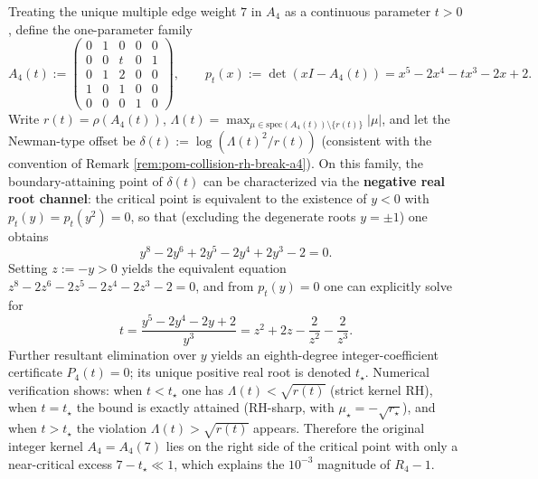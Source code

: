 \begin{remark}\label{rem:pom-collision-rh-break-a4-threshold}
Treating the unique multiple edge weight \(7\) in \(A_4\) as a continuous parameter \(t>0\), define the one-parameter family
\[
A_4(t):=
\begin{pmatrix}
0&1&0&0&0\\
0&0&t&0&1\\
0&1&2&0&0\\
1&0&1&0&0\\
0&0&0&1&0
\end{pmatrix},
\qquad
p_t(x):=\det(xI-A_4(t))=x^5-2x^4-tx^3-2x+2.
\]
Write \(r(t)=\rho(A_4(t))\), \(\Lambda(t)=\max_{\mu\in\mathrm{spec}(A_4(t))\setminus\{r(t)\}}|\mu|\), and let the Newman-type offset be
\(
\delta(t):=\log(\Lambda(t)^2/r(t))
\)
(consistent with the convention of Remark \ref{rem:pom-collision-rh-break-a4}).
On this family, the boundary-attaining point of \(\delta(t)\) can be characterized via the \textbf{negative real root channel}: the critical point is equivalent to the existence of \(y<0\) with \(p_t(y)=p_t(y^2)=0\), so that (excluding the degenerate roots \(y=\pm 1\)) one obtains
\[
y^8-2y^6+2y^5-2y^4+2y^3-2=0.
\]
Setting \(z:=-y>0\) yields the equivalent equation
\(
z^8-2z^6-2z^5-2z^4-2z^3-2=0
\), and from \(p_t(y)=0\) one can explicitly solve for
\[
t=\frac{y^5-2y^4-2y+2}{y^3}
=z^2+2z-\frac{2}{z^2}-\frac{2}{z^3}.
\]
Further resultant elimination over \(y\) yields an eighth-degree integer-coefficient certificate \(P_4(t)=0\); its unique positive real root is denoted \(t_\star\).
Numerical verification shows: when \(t<t_\star\) one has \(\Lambda(t)<\sqrt{r(t)}\) (strict kernel RH), when \(t=t_\star\) the bound is exactly attained (RH-sharp, with \(\mu_\star=-\sqrt{r_\star}\)), and when \(t>t_\star\) the violation \(\Lambda(t)>\sqrt{r(t)}\) appears.
 Therefore the original integer kernel \(A_4=A_4(7)\) lies on the right side of the critical point with only a near-critical excess \(7-t_\star\ll 1\), which explains the \(10^{-3}\) magnitude of \(R_4-1\).
\end{remark}



